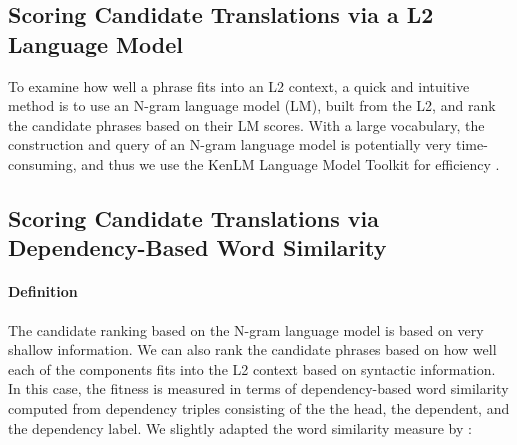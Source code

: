 \documentclass[11pt]{article}
\begin{document}


\subsection{Scoring Candidate Translations via a L2 Language Model}
\label{sec:l2model}

To examine how well a phrase fits into an L2 context, a quick and intuitive method is to use an N-gram language model (LM), built from the L2, and rank the candidate phrases based on their LM scores. With a large vocabulary, the construction and query of an N-gram language model is potentially very time-consuming, and thus we use the KenLM Language Model Toolkit for efficiency \cite{heafield:kenlm:11}.


\subsection{Scoring Candidate Translations via Dependency-Based Word Similarity}
\label{sec:dependencySIM}

\paragraph{Definition} The candidate ranking based on the N-gram language model is based on very shallow information. We can also rank the candidate phrases based on how well each of the components fits into the L2 context based on syntactic information. In this case, the fitness is measured in terms of dependency-based word similarity computed from dependency triples consisting of the the head, the dependent, and the dependency label. We slightly adapted the word similarity measure by :\\
\end{document}
